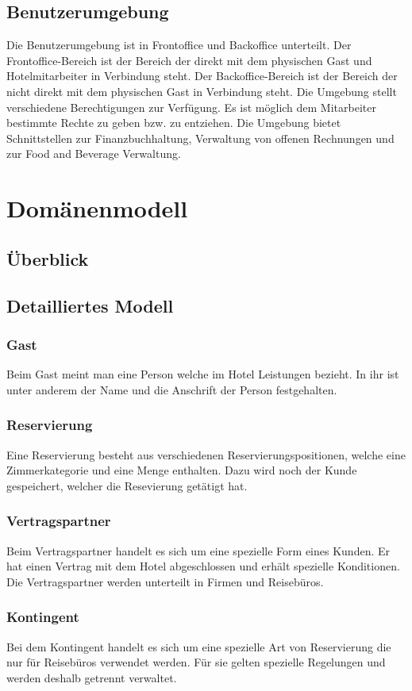 \documentclass[10pt,a4paper,titlepage]{article}
\begin{document}
\newpage
\subsection{Benutzerumgebung}
Die Benutzerumgebung ist in Frontoffice und Backoffice unterteilt. Der Frontoffice-Bereich ist der Bereich der direkt mit dem physischen Gast und Hotelmitarbeiter in Verbindung steht. Der Backoffice-Bereich ist der Bereich der nicht direkt mit dem physischen Gast in Verbindung steht. Die Umgebung stellt verschiedene Berechtigungen zur Verfügung. Es ist möglich dem Mitarbeiter bestimmte Rechte zu geben bzw. zu entziehen. Die Umgebung bietet Schnittstellen zur Finanzbuchhaltung, Verwaltung von offenen Rechnungen und zur Food and Beverage Verwaltung.

\section{Domänenmodell}
\subsection{Überblick}
\subsection{Detailliertes Modell}
\subsubsection{Gast}
Beim Gast meint man eine Person welche im Hotel Leistungen bezieht. In ihr ist unter anderem der Name und die Anschrift der Person festgehalten.
\subsubsection{Reservierung}
Eine Reservierung besteht aus verschiedenen Reservierungspositionen, welche eine Zimmerkategorie und eine Menge enthalten. Dazu wird noch der Kunde gespeichert, welcher die Resevierung getätigt hat.
\subsubsection{Vertragspartner}
Beim Vertragspartner handelt es sich um eine spezielle Form eines Kunden. Er hat einen Vertrag mit dem Hotel abgeschlossen und erhält spezielle Konditionen. Die Vertragspartner werden unterteilt in Firmen und Reisebüros.
\subsubsection{Kontingent}
Bei dem Kontingent handelt es sich um eine spezielle Art von Reservierung die nur für Reisebüros verwendet werden. Für sie gelten spezielle Regelungen und werden deshalb getrennt verwaltet.
\end{document}

